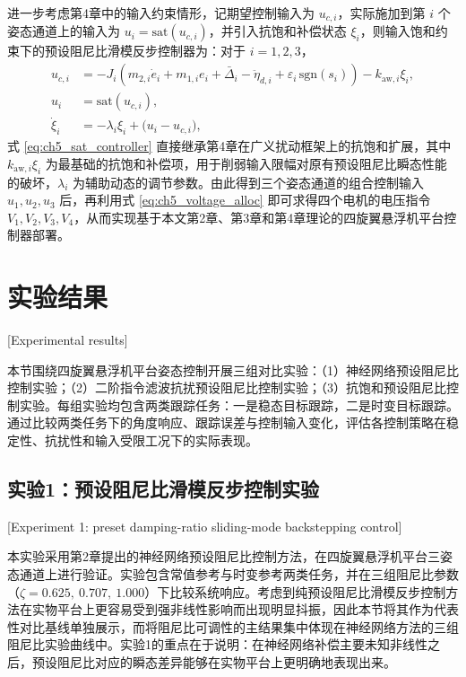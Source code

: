 进一步考虑第4章中的输入约束情形，记期望控制输入为 $u_{c,i}$，实际施加到第 $i$ 个姿态通道上的输入为 $u_i=\mathrm{sat}(u_{c,i})$，并引入抗饱和补偿状态 $\xi_i$，则输入饱和约束下的预设阻尼比滑模反步控制器为：对于 $i=1,2,3$，
\begin{subequations}\label{eq:ch5_sat_controller}
\begin{align}
u_{c,i} &=-J_i\left(m_{2,i}\dot e_i+m_{1,i}e_i+\bar\Delta_i-\ddot\eta_{d,i}
+\varepsilon_i\,\mathrm{sgn}(s_i)\right)-k_{\mathrm{aw},i}\xi_i,\\
u_i &= \mathrm{sat}(u_{c,i}),\\
\dot\xi_i &=-\lambda_i\xi_i+\big(u_i-u_{c,i}\big),
\end{align}
\end{subequations}
式 \eqref{eq:ch5_sat_controller} 直接继承第4章在广义扰动框架上的抗饱和扩展，其中 $k_{\mathrm{aw},i}\xi_i$ 为最基础的抗饱和补偿项，用于削弱输入限幅对原有预设阻尼比瞬态性能的破坏，$\lambda_i$ 为辅助动态的调节参数。由此得到三个姿态通道的组合控制输入 $u_1,u_2,u_3$ 后，再利用式 \eqref{eq:ch5_voltage_alloc} 即可求得四个电机的电压指令 $V_1,V_2,V_3,V_4$，从而实现基于本文第2章、第3章和第4章理论的四旋翼悬浮机平台控制器部署。

\section{实验结果}[Experimental results]

本节围绕四旋翼悬浮机平台姿态控制开展三组对比实验：（1）神经网络预设阻尼比控制实验；（2）二阶指令滤波抗扰预设阻尼比控制实验；（3）抗饱和预设阻尼比控制实验。每组实验均包含两类跟踪任务：一是稳态目标跟踪，二是时变目标跟踪。通过比较两类任务下的角度响应、跟踪误差与控制输入变化，评估各控制策略在稳定性、抗扰性和输入受限工况下的实际表现。

\subsection{实验1：预设阻尼比滑模反步控制实验}[Experiment 1: preset damping-ratio sliding-mode backstepping control]

本实验采用第2章提出的神经网络预设阻尼比控制方法，在四旋翼悬浮机平台三姿态通道上进行验证。实验包含常值参考与时变参考两类任务，并在三组阻尼比参数（$\zeta=0.625,\ 0.707,\ 1.000$）下比较系统响应。考虑到纯预设阻尼比滑模反步控制方法在实物平台上更容易受到强非线性影响而出现明显抖振，因此本节将其作为代表性对比基线单独展示，而将阻尼比可调性的主结果集中体现在神经网络方法的三组阻尼比实验曲线中。实验1的重点在于说明：在神经网络补偿主要未知非线性之后，预设阻尼比对应的瞬态差异能够在实物平台上更明确地表现出来。

